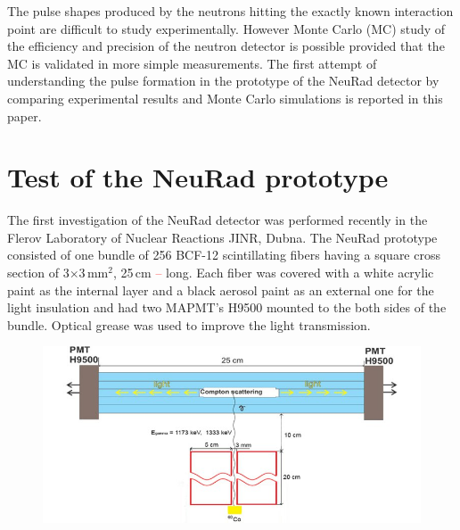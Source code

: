 \documentclass{webofc}
\newcommand{\red}[1]{\textcolor{red}{#1}}
\begin{document}
The pulse shapes produced by the neutrons hitting the exactly known interaction point are difficult to study experimentally. However Monte Carlo (MC) study of the efficiency and precision of the neutron detector is possible provided that the MC is validated in more simple measurements.
The first attempt of understanding the pulse formation in the prototype of the NeuRad  detector by comparing experimental results and Monte Carlo simulations is reported in this paper. 

\section{Test of the NeuRad prototype}

The first investigation of the NeuRad detector was performed recently in the Flerov Laboratory of Nuclear Reactions JINR, Dubna.
The NeuRad prototype consisted of one bundle of 256 BCF-12 \cite{crystals} scintillating fibers having a square cross section of 3$\times$3\,mm$^2$, 25\,cm \red{--} long.
Each fiber was covered with a white acrylic paint as the internal layer and a black aerosol paint as an external one for the light insulation and had two MAPMT's H9500 \cite{hm} mounted to the both sides of the bundle. Optical grease was used to improve the light transmission.

\begin{figure}[h]
	\centering
	\includegraphics[width=0.7\linewidth]{NeuRadexperiment.png}
\label{ris:neuradexp}
\end{figure}
\end{document}
